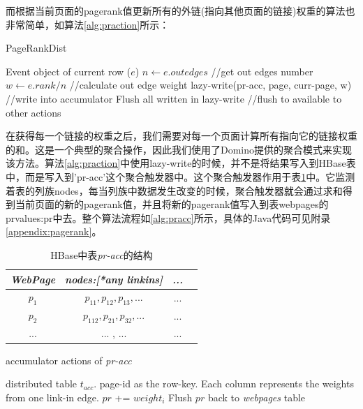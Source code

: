 而根据当前页面的pagerank值更新所有的外链(指向其他页面的链接)权重的算法也非常简单，如算法\ref{alg:praction}所示：

\begin{algorithm}[]
  \caption{PageRankDist}
  \label{alg:praction}
  \begin{algorithmic}
    \REQUIRE Event object of current row ($e$)
    \STATE $n \leftarrow e.outedges$     //get out edges number
    \STATE $w \leftarrow e.rank/n $                //calculate out edge weight
    \STATE lazy-write(pr-acc, page, curr-page, w) //write into accumulator
    \ENDFOR
    \STATE Flush all written in lazy-write               //flush to available to other actions
  \end{algorithmic}
\end{algorithm}

在获得每一个链接的权重之后，我们需要对每一个页面计算所有指向它的链接权重的和。这是一个典型的聚合操作，因此我们使用了Domino提供的聚合模式来实现该方法。算法\ref{alg:praction}中使用lazy-write的时候，并不是将结果写入到HBase表中，而是写入到'pr-acc'这个聚合触发器中。这个聚合触发器作用于表\ref{table:acc}中。它监测着表的列族nodes，每当列族中数据发生改变的时候，聚合触发器就会通过求和得到当前页面的新的pagerank值，并且将新的pagerank值写入到表webpages的prvalues:pr中去。整个算法流程如\ref{alg:pracc}所示，具体的Java代码可见附录\ref{appendix:pagerank}。


\begin{table}[ht]\small
\caption{HBase中表\textit{pr-acc}的结构}
\label{table:acc}
\centering
\begin{tabular}{|c|c|c|c|}
\hline
\textit{WebPage} & \textit{nodes:[*any linkins]} & \textit{...}\\
\hline
$p_1$ & $p_{11}, p_{12}, p_{13}, ...$ & ... \\
\hline
$p_2$ & $p_{112}, p_{21}, p_{32}, ...$& ... \\
\hline
... & ... , ... & ... \\
\hline
\end{tabular}
\end{table}

\begin{algorithm}[ht]
  \caption{accumulator actions of \textit{pr-acc}}
  \label{alg:pracc}
  \begin{algorithmic}
    \REQUIRE distributed table $t_{acc}$. page-id as the row-key.
    \REQUIRE Each column represents the weights from one link-in edge.
    \STATE $pr$ += $weight_i$
    \ENDFOR
    \STATE Flush $pr$ back to \textit{webpages} table
  \end{algorithmic}
\end{algorithm}

